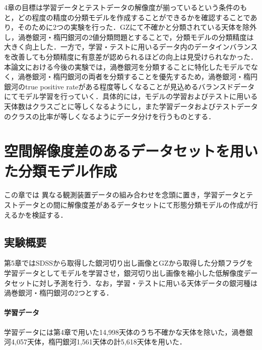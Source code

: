 \documentclass[a4j, 11pt]{jreport}
\begin{document}
4章の目標は学習データとテストデータの解像度が揃っているという条件のもと，どの程度の精度の分類モデルを作成することができるかを確認することであり，そのために2つの実験を行った．GZにて不確かと分類されている天体を除外し，渦巻銀河・楕円銀河の2値分類問題とすることで，分類モデルの分類精度は大きく向上した．一方で，学習・テストに用いるデータ内のデータインバランスを改善しても分類精度に有意差が認められるほどの向上は見受けられなかった．本論文における今後の実験では，渦巻銀河を分類することに特化したモデルでなく，渦巻銀河・楕円銀河の両者を分類することを優先するため，渦巻銀河・楕円銀河のtrue positive rateがある程度等しくなることが見込めるバランスドデータにてモデル学習を行っていく．具体的には，モデルの学習およびテストに用いる天体数はクラスごとに等しくなるようにし，また学習データおよびテストデータのクラスの比率が等しくなるようにデータ分けを行うものとする．



\newpage
\chapter{空間解像度差のあるデータセットを用いた分類モデル作成}

この章では
異なる観測装置データの組み合わせを念頭に置き，学習データとテストデータとの間に解像度差があるデータセットにて形態分類モデルの作成が行えるかを検証する．

\section{実験概要}
第5章ではSDSSから取得した銀河切り出し画像とGZから取得した分類フラグを学習データとしてモデルを学習させ，銀河切り出し画像を縮小した低解像度データセットに対し予測を行う．なお，学習・テストに用いる天体データの銀河種は渦巻銀河・楕円銀河の2つとする．

\subsubsection{学習データ}
学習データには第4章で用いた14,998天体のうち不確かな天体を除いた，渦巻銀河4,057天体，楕円銀河1,561天体の計5,618天体を用いた．
\end{document}
